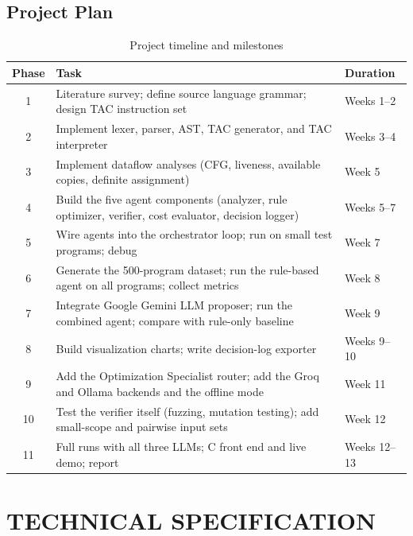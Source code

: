 \documentclass[12pt,a4paper]{report}
\begin{document}
\section{Project Plan}

\begin{table}[H]
\centering
\caption{Project timeline and milestones}
\label{tab:plan}
\begin{tabularx}{\textwidth}{|c|X|l|}
\hline
\textbf{Phase} & \textbf{Task} & \textbf{Duration} \\
\hline
1 & Literature survey; define source language grammar; design TAC instruction set & Weeks 1--2 \\
\hline
2 & Implement lexer, parser, AST, TAC generator, and TAC interpreter & Weeks 3--4 \\
\hline
3 & Implement dataflow analyses (CFG, liveness, available copies, definite assignment) & Week 5 \\
\hline
4 & Build the five agent components (analyzer, rule optimizer, verifier, cost evaluator, decision logger) & Weeks 5--7 \\
\hline
5 & Wire agents into the orchestrator loop; run on small test programs; debug & Week 7 \\
\hline
6 & Generate the 500-program dataset; run the rule-based agent on all programs; collect metrics & Week 8 \\
\hline
7 & Integrate Google Gemini LLM proposer; run the combined agent; compare with rule-only baseline & Week 9 \\
\hline
8 & Build visualization charts; write decision-log exporter & Weeks 9--10 \\
\hline
9 & Add the Optimization Specialist router; add the Groq and Ollama backends and the offline mode & Week 11 \\
\hline
10 & Test the verifier itself (fuzzing, mutation testing); add small-scope and pairwise input sets & Week 12 \\
\hline
11 & Full runs with all three LLMs; C front end and live demo; report & Weeks 12--13 \\
\hline
\end{tabularx}
\end{table}


\chapter{TECHNICAL SPECIFICATION}
\end{document}
